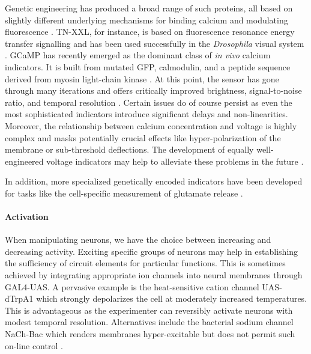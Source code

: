 Genetic engineering has produced a broad range of such proteins, all based on slightly different underlying mechanisms for binding calcium and modulating fluorescence \citep{Knopfel:2012aa}. TN-XXL, for instance, is based on fluorescence resonance energy transfer signalling and has been used successfully in the \textit{Drosophila} visual system \citep{Mank:2008kg,Reiff:2010eo}. GCaMP has recently emerged as the dominant class of \textit{in vivo} calcium indicators. It is built from mutated GFP, calmodulin, and a peptide sequence derived from myosin light-chain kinase \citep{Nakai:2001aa}. At this point, the sensor has gone through many iterations and offers critically improved brightness, signal-to-noise ratio, and temporal resolution \citep{Chen:2013fc}. Certain issues do of course persist as even the most sophisticated indicators introduce significant delays and non-linearities. Moreover, the relationship between calcium concentration and voltage is highly complex and masks potentially crucial effects like hyper-polarization of the membrane or sub-threshold deflections. The development of equally well-engineered voltage indicators may help to alleviate these problems in the future \citep{Looger:2012aa}.

In addition, more specialized genetically encoded indicators have been developed for tasks like the cell-specific measurement of glutamate release \citep{Marvin:2013aa}.

\paragraph{Activation} When manipulating neurons, we have the choice between increasing and decreasing activity. Exciting specific groups of neurons may help in establishing the sufficiency of circuit elements for particular functions. This is sometimes achieved by integrating appropriate ion channels into neural membranes through GAL4-UAS. A pervasive example is the heat-sensitive cation channel UAS-dTrpA1 \citep{Rosenzweig:2005aa,Parisky:2008aa} which strongly depolarizes the cell at moderately increased temperatures. This is advantageous as the experimenter can reversibly activate neurons with modest temporal resolution. Alternatives include the bacterial sodium channel NaCh-Bac which renders membranes hyper-excitable but does not permit such on-line control \citep{Nitabach:2006aa}.

